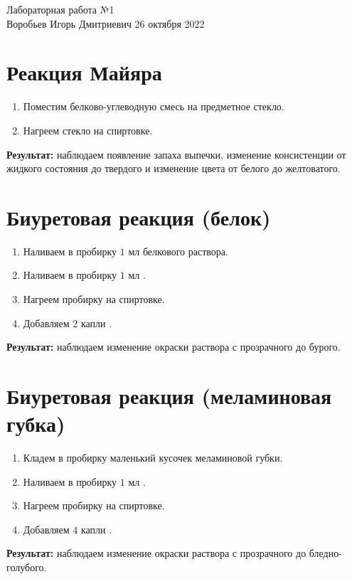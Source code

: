 \documentclass[12pt, letterpaper, twoside]{article}
\begin{document}
\begin{center}
	\LARGE{Лабораторная работа №1}\\[0.2cm]
	\large{Воробьев Игорь Дмитриевич}
	\large{26 октября 2022}
\end{center}

\section{Реакция Майяра}
\begin{enumerate}
	\item Поместим белково-углеводную смесь на предметное стекло.
	\item Нагреем стекло на спиртовке.
\end{enumerate}
\textbf{Результат:} наблюдаем появление запаха выпечки, изменение консистенции от жидкого состояния до твердого и изменение цвета от белого до желтоватого.

\section{Биуретовая реакция (белок)}
\begin{enumerate}
	\item Наливаем в пробирку $1$ мл белкового раствора. 
	\item Наливаем в пробирку $1$ мл .
	\item Нагреем пробирку на спиртовке.
	\item Добавляем $2$ капли .
\end{enumerate}
\textbf{Результат:} наблюдаем изменение окраски раствора с прозрачного до бурого.

\section{Биуретовая реакция (меламиновая губка)}
\begin{enumerate}
	\item Кладем в пробирку маленький кусочек меламиновой губки. 
	\item Наливаем в пробирку $1$ мл .
	\item Нагреем пробирку на спиртовке.
	\item Добавляем $4$ капли .
\end{enumerate}
\textbf{Результат:} наблюдаем изменение окраски раствора с прозрачного до бледно-голубого. 
\end{document}

